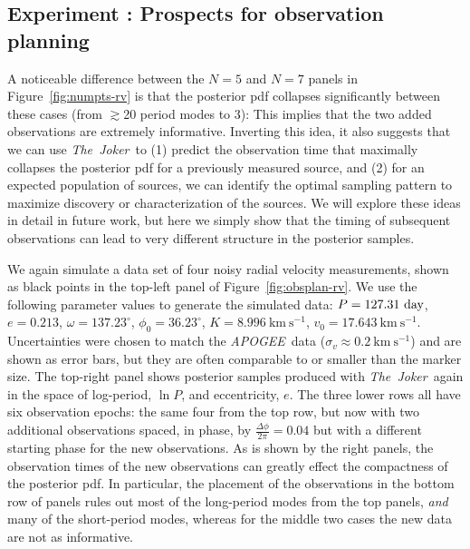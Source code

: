\documentclass[manuscript, letterpaper]{aastex6}
\newcommand{\project}[1]{\textsl{#1}}
\newcommand{\acronym}[1]{{\small{#1}}}
\newcommand{\apogee}{\project{\acronym{APOGEE}}}
\newcommand{\samplername}{\project{The~Joker}}
\newcommand{\figname}{Figure}
\newcommand{\kms}{\mathrm{km}~\mathrm{s}^{-1}}
\newcounter{expcounter}
\begin{document}
\subsection{Experiment : Prospects for observation planning}
\label{sec:obsplan}

A noticeable difference between the $N=5$ and $N=7$ panels in
\figname~\ref{fig:numpts-rv} is that the posterior pdf collapses significantly
between these cases (from $\gtrsim$20 period modes to 3):
This implies that the two added observations are extremely informative.
Inverting this idea, it also suggests that we can use \samplername\ to (1)
predict the observation time that maximally collapses the posterior pdf for a
previously measured source, and (2) for an expected population of sources, we
can identify the optimal sampling pattern to maximize discovery or
characterization of the sources.
We will explore these ideas in detail in future work, but here we simply show
that the timing of subsequent observations can lead to very different
structure in the posterior samples.

We again simulate a data set of four noisy radial velocity measurements, shown
as black points in the top-left panel of \figname~\ref{fig:obsplan-rv}.
We use the following parameter values to generate the simulated data:
$P = 127.31~{\rm day}$, $e = 0.213$, $\omega = 137.23^\circ$, $\phi_0 =
36.23^\circ$, $K = 8.996~\kms$, $v_0 = 17.643~\kms$.
Uncertainties were chosen to match the \apogee\ data ($\sigma_v \approx
0.2~\kms$) and are shown as error bars, but they are often comparable to or
smaller than the marker size.
The top-right panel shows posterior samples produced with \samplername\ again in the
space of log-period, $\ln P$, and eccentricity, $e$.
The three lower rows all have six observation epochs: the same four from the top row,
but now with two additional observations spaced, in phase, by $\frac{\Delta
\phi}{2 \pi} = 0.04$ but with a different starting phase for the new
observations.
As is shown by the right panels, the observation times of the new observations
can greatly effect the compactness of the posterior pdf.
In particular, the placement of the observations in the bottom row of panels
rules out most of the long-period modes from the top panels, \emph{and} many of
the short-period modes, whereas for the middle two cases the new data are not as
informative.
\end{document}
